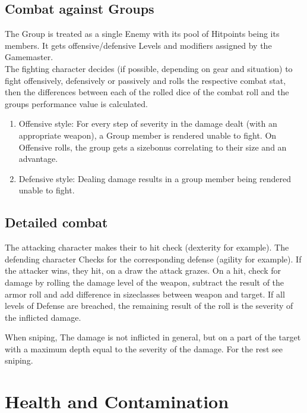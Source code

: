 \subsection{Combat against Groups}
The Group is treated as a single Enemy with its pool of Hitpoints being its members.
It gets offensive/defensive Levels and modifiers assigned by the Gamemaster.\\
The fighting character decides (if possible, depending on gear and situation) to fight offensively, defensively
or passively and rolls the respective combat stat, then the differences between each of the rolled dice of the combat
roll and the groups performance value is calculated.\par
\begin{enumerate}[label= - ]
    \item Offensive style: For every step of severity in the damage dealt (with an appropriate weapon),
    a Group member is rendered unable to
    fight.
    On Offensive rolls, the group gets a sizebonus correlating to their size and an advantage.
    \item Defensive style: Dealing damage results in a group member being rendered unable to fight.
\end{enumerate}
\subsection{Detailed combat}
The attacking character makes their to hit check (dexterity for example).
The defending character Checks for the
corresponding defense (agility for example).
If the attacker wins, they hit, on a draw the
attack grazes.
On a hit, check for damage by rolling the damage level of the weapon, subtract the result of the
armor roll and add difference in sizeclasses between weapon and target.
If all levels of Defense are breached, the remaining result of the roll is the severity of the inflicted damage.\par
When sniping, The damage is not inflicted in general, but on a part of the target with a maximum depth equal to
the severity of the damage.
For the rest see sniping.
\section{Health and Contamination}\label{subsec:healthAndContamination}

